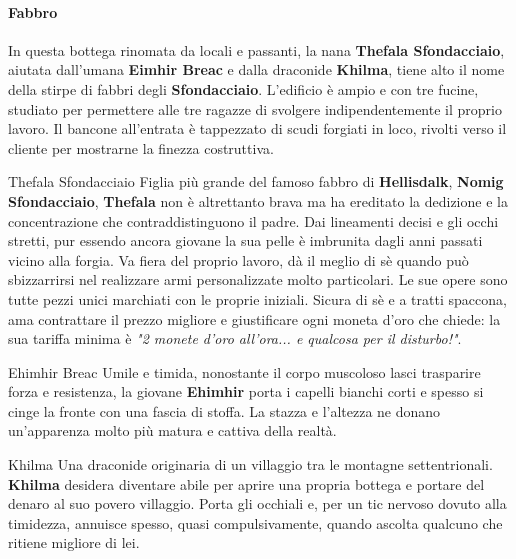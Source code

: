 \documentclass[10pt,twoside,onecolumn,openany]{book}
\begin{document}
\paragraph{Fabbro} In questa bottega rinomata da locali e passanti, la nana \textbf{Thefala Sfondacciaio}, aiutata dall'umana \textbf{Eimhir Breac} e dalla draconide \textbf{Khilma}, tiene alto il nome della stirpe di fabbri degli \textbf{Sfondacciaio}. L'edificio è ampio e con tre fucine, studiato per permettere alle tre ragazze di svolgere indipendentemente il proprio lavoro. Il bancone all'entrata è tappezzato di scudi forgiati in loco, rivolti verso il cliente per mostrarne la finezza costruttiva.
\begin{paperbox}{{Thefala Sfondacciaio}}
Figlia più grande del famoso fabbro di \textbf{Hellisdalk}, \textbf{Nomig Sfondacciaio}, \textbf{Thefala} non è altrettanto brava ma ha ereditato la dedizione e la concentrazione che contraddistinguono il padre. Dai lineamenti decisi e gli occhi stretti, pur essendo ancora giovane la sua pelle è imbrunita dagli anni passati vicino alla forgia. Va fiera del proprio lavoro, dà il meglio di sè quando può sbizzarrirsi nel realizzare armi personalizzate molto particolari. Le sue opere sono tutte pezzi unici marchiati con le proprie iniziali. Sicura di sè e a tratti spaccona, ama contrattare il prezzo migliore e giustificare ogni moneta d'oro che chiede: la sua tariffa minima è \textit{"2 monete d'oro all'ora... e qualcosa per il disturbo!"}.
\end{paperbox}
\begin{multicols}{2}
\begin{paperbox}{{Ehimhir Breac}}
Umile e timida, nonostante il corpo muscoloso lasci trasparire forza e resistenza, la giovane \textbf{Ehimhir} porta i capelli bianchi corti e spesso si cinge la fronte con una fascia di stoffa. La stazza e l'altezza ne donano un'apparenza molto più matura e cattiva della realtà.
\end{paperbox}
\begin{paperbox}{{Khilma}}
Una draconide originaria di un villaggio tra le montagne settentrionali. \textbf{Khilma} desidera diventare abile per aprire una propria bottega e portare del denaro al suo povero villaggio. Porta gli occhiali e, per un tic nervoso dovuto alla timidezza, annuisce spesso, quasi compulsivamente, quando ascolta qualcuno che ritiene migliore di lei.
\end{paperbox}
\end{multicols}
\newpage
\end{document}
